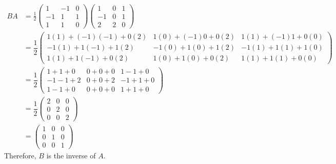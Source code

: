 \documentclass[11pt,letterpaper]{article}
\begin{document}
	\[
	\begin{aligned}
	BA&= \frac{1}{2} \begin{pmatrix} 1 & -1 & 0 \\ -1 & 1 & 1 \\ 1 & 1 & 0 \end{pmatrix} \begin{pmatrix} 1 & 0 & 1 \\ -1 & 0 & 1 \\ 2 & 2 & 0 \end{pmatrix} \\
	&= \dfrac{1}{2} \begin{pmatrix} 1(1) + (-1)(-1) + 0(2) & 1(0) + (-1)0 + 0(2) & 1(1) + (-1)1 + 0(0) \\
	-1(1) + 1(-1) + 1(2) & -1(0) + 1(0) + 1(2) & -1(1) + 1(1) + 1(0) \\
	1(1) + 1(-1) + 0(2) & 1(0) + 1(0) + 0(2) & 1(1) + 1(1) + 0(0) 
	\end{pmatrix} \\
	&= \dfrac{1}{2} \begin{pmatrix} 1 + 1 + 0 & 0 + 0 + 0 & 1 - 1 + 0 \\
	-1 - 1 + 2 & 0 + 0 + 2 & -1 + 1 + 0 \\
	1 - 1 + 0 & 0 + 0 + 0 & 1 + 1 + 0 
	\end{pmatrix} \\
	&= \dfrac{1}{2} \begin{pmatrix} 2 & 0 & 0 \\ 0 & 2 & 0 \\ 0 & 0 & 2 \end{pmatrix} \\
	&= \begin{pmatrix} 1 & 0 & 0 \\ 0 & 1 & 0 \\ 0 & 0 & 1 \end{pmatrix}
	\end{aligned}
	\]
Therefore, $B$ is the inverse of $A$. 



\newpage
\end{document}
